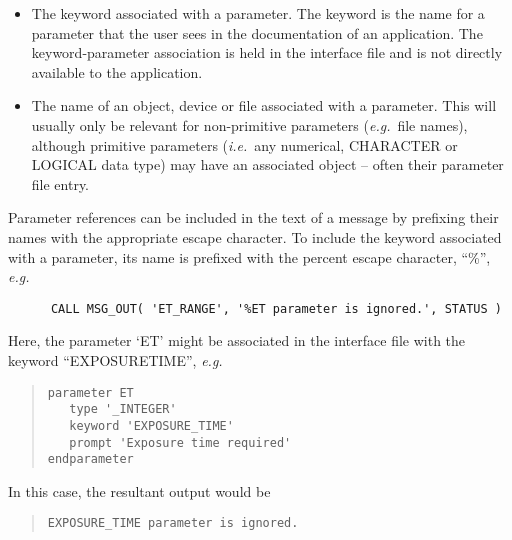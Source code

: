 \documentclass[twoside,11pt]{article}
\renewcommand{\_}{\texttt{\symbol{95}}}
\begin{document}
\begin {itemize}
\item The keyword associated with a parameter. 
The keyword is the name for a parameter that the user sees in the 
documentation of an application. 
The keyword-parameter association is held in the interface file and is
not directly available to the application. 

\item The name of an object, device or file associated with a parameter. 
This will usually only be relevant for non-primitive parameters 
(\textit{e.g.}\ file names), although primitive parameters (\textit{i.e.}\ any 
numerical, CHARACTER or LOGICAL data type) may have an associated object -- 
often their parameter file entry.
\end {itemize}

Parameter references can be included in the text of a message by prefixing 
their names with the appropriate escape character. 
To include the keyword associated with a parameter, its name is prefixed with
the percent escape character, ``\%'', \textit{e.g.}

\begin {small}
\begin{verbatim}
      CALL MSG_OUT( 'ET_RANGE', '%ET parameter is ignored.', STATUS )
\end{verbatim}
\end {small}

\begin {sloppypar}
Here, the parameter `ET' might be associated in the interface file 
with the keyword ``EXPOSURE\_TIME'', \textit{e.g.}
\end {sloppypar}

\begin {quote}
\begin {small}
\begin{verbatim}
parameter ET
   type '_INTEGER'
   keyword 'EXPOSURE_TIME'
   prompt 'Exposure time required'
endparameter
\end{verbatim}
\end {small}
\end {quote}

In this case, the resultant output would be

\begin {quote}
\begin {small}
\begin{verbatim}
EXPOSURE_TIME parameter is ignored.
\end{verbatim}
\end {small}
\end {quote}
\end{document}
